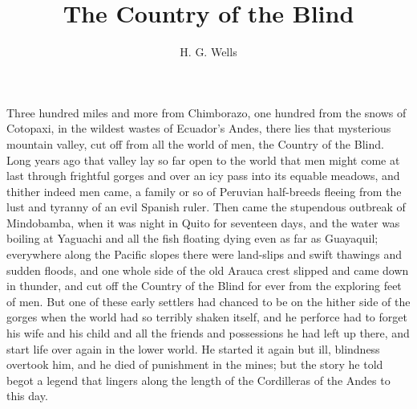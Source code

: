 \documentclass[courier]{sffms}
\author{H. G. Wells}
\title{The Country of the Blind}
\begin{document}
Three hundred miles and more from Chimborazo, one hundred from the
snows of Cotopaxi, in the wildest wastes of Ecuador's Andes, there
lies that mysterious mountain valley, cut off from all the world of
men, the Country of the Blind.  Long years ago that valley lay so far
open to the world that men might come at last through frightful gorges
and over an icy pass into its equable meadows, and thither indeed men
came, a family or so of Peruvian half-breeds fleeing from the lust and
tyranny of an evil Spanish ruler. Then came the stupendous outbreak of
Mindobamba, when it was night in Quito for seventeen days, and the
water was boiling at Yaguachi and all the fish floating dying even as
far as Guayaquil; everywhere along the Pacific slopes there were
land-slips and swift thawings and sudden floods, and one whole side of
the old Arauca crest slipped and came down in thunder, and cut off the
Country of the Blind for ever from the exploring feet of men. But one
of these early settlers had chanced to be on the hither side of the
gorges when the world had so terribly shaken itself, and he perforce
had to forget his wife and his child and all the friends and
possessions he had left up there, and start life over again in the
lower world. He started it again but ill, blindness overtook him, and
he died of punishment in the mines; but the story he told begot a
legend that lingers along the length of the Cordilleras of the Andes
to this day.
\end{document}
